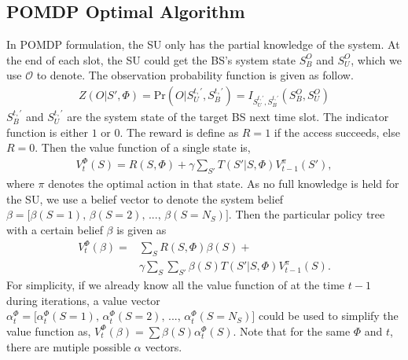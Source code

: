 \documentclass[conference]{IEEEtran}
\begin{document}
\subsection{POMDP Optimal Algorithm}
In POMDP formulation, the SU only has the partial knowledge of the system.
At the end of each slot, the SU could get the BS's system state \(S_B^O\) and \(S_U^O\),
which we use \(\mathcal{O}\) to denote.
The observation probability function is given as follow.
\begin{align}
	Z\left(O|S',\Phi\right) = \mbox{Pr}\left(O|S_U^{t,'}, S_B^{t,'}\right) =
	I_{S_U^{t,'},S_B^{t,'}}\left(S_B^O, S_U^O\right)
\end{align}
\(S_B^{t,'}\) and \(S_U^{t,'}\) are the system state of the target BS next time slot.
The indicator function is either \(1\) or \(0\).
The reward is define as \(R = 1\) if the access succeeds, else \(R= 0\).
Then the value function of a single state is,
\begin{equation}
\begin{aligned}
	V_t^\Phi\left(S\right) = R\left(S,\Phi\right) +\gamma\sum\limits_{S'}T\left(S'|S,\Phi\right)V_{t-1}^\pi\left(S'\right),
\end{aligned}%
\end{equation}
where \(\pi\) denotes the optimal action in that state.
As no full knowledge is held for the SU, we use a belief vector to denote the system belief
\(\beta = \lbrack \beta\left(S = 1\right),\,\beta\left(S = 2\right),\,...,\,\beta\left(S = N_S\right)\rbrack\).	
Then the particular policy tree with a certain belief \(\beta\) is given as
\begin{equation}
\begin{aligned}
	V_t^\Phi\left(\beta\right) = & \sum\limits_{S}R\left(S,\Phi\right)\beta\left(S\right) +\\
	&	\gamma\sum\limits_{S}\sum\limits_{S'}\beta\left(S\right)T\left(S'|S,\Phi\right)V_{t-1}^\pi\left(S\right).
\end{aligned}
\end{equation}
For simplicity, if we already know all the value function of at the time \(t-1\) during iterations,
a value vector \(\alpha_t^\Phi = \lbrack \alpha_t^\Phi\left(S = 1\right),\,
\alpha_t^\Phi\left(S = 2\right),\,...,\,\alpha_t^\Phi\left(S = N_S\right)\rbrack\)
could be used to simplify the value function as, 
\(V_t^\Phi\left(\beta\right) = \sum\beta\left(S\right)\alpha_t^\Phi\left(S\right)\).
Note that for the same \(\Phi\) and \(t\), there are mutiple possible \(\alpha\) vectors.
\end{document}
